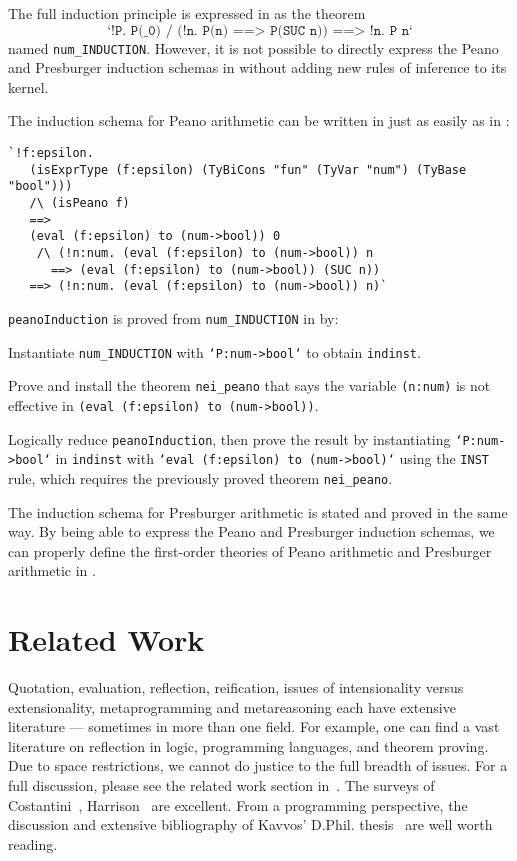\documentclass[fleqn]{llncs}
\begin{document}
The full induction principle is expressed in {\HL} as the
theorem \[\texttt{`!P. P(\_0) /\ (!n. P(n) ==> P(SUC n)) ==> !n. P
  n`}\] named \texttt{num\_INDUCTION}.  However, it is not possible to
directly express the Peano and Presburger induction schemas in {\HL}
without adding new rules of inference to its kernel.

\bsp
The induction schema for Peano arithmetic can be written in
{\HLQE} just as easily as in {\churchqe}:
\begin{lstlisting}
`!f:epsilon. 
   (isExprType (f:epsilon) (TyBiCons "fun" (TyVar "num") (TyBase "bool"))) 
   /\ (isPeano f) 
   ==> 
   (eval (f:epsilon) to (num->bool)) 0 
    /\ (!n:num. (eval (f:epsilon) to (num->bool)) n 
      ==> (eval (f:epsilon) to (num->bool)) (SUC n)) 
   ==> (!n:num. (eval (f:epsilon) to (num->bool)) n)`
\end{lstlisting}
\esp

\noindent \texttt{peanoInduction} is proved from
\texttt{num\_INDUCTION} in {\HLQE} by:

\bsp
\be

  \item Instantiate \texttt{num\_INDUCTION} with
    \texttt{`P:num->bool`} to obtain \texttt{indinst}.

  \item Prove and install the theorem \texttt{nei\_peano} that says the
    variable \texttt{(n:num)} is not effective in \texttt{(eval
      (f:epsilon) to (num->bool))}.

  \item Logically reduce \texttt{peanoInduction}, then prove the
    result by instantiating \texttt{`P:num->bool`} in \texttt{indinst}
    with \texttt{`eval (f:epsilon) to (num->bool)`} using the
    \texttt{INST} rule,  which requires the
    previously proved theorem \texttt{nei\_peano}.

\ee 
\esp 

\noindent 
The induction schema for Presburger arithmetic is stated and proved in
the same way.  By being able to express the Peano and Presburger induction
schemas, we can properly define the first-order theories of Peano
arithmetic and Presburger arithmetic in {\HLQE}.

\section{Related Work}\label{sec:related-work}

Quotation, evaluation, reflection, reification, issues of
intensionality versus extensionality, metaprogramming and
metareasoning each have extensive literature --- sometimes
in more than one field.  For example, one can find a
vast literature on reflection in logic, programming languages,
and theorem proving. Due to space restrictions, we cannot
do justice to the full breadth of issues. For a full discussion,
please see the related work section in~\cite{Farmer18}.
The surveys of Costantini~\cite{Costantini02},
Harrison~\cite{Harrison95} are excellent. From a
programming perspective, the discussion and extensive 
bibliography of Kavvos' D.Phil. thesis~\cite{Kavvos2017}
are well worth reading.
\end{document}
